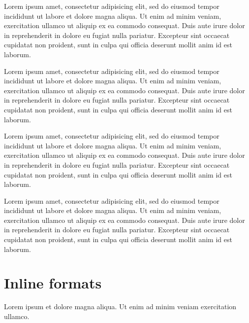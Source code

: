 \documentclass{article}
\begin{document}
\begin{multicols}{2}
Lorem ipsum  amet, consectetur adipisicing elit, sed
do eiusmod tempor incididunt ut labore et dolore magna aliqua. Ut enim
ad minim veniam,  exercitation ullamco
 ut aliquip ex ea commodo consequat. Duis aute
irure dolor in reprehenderit in 
dolore eu fugiat nulla pariatur. Excepteur sint occaecat cupidatat non
proident, sunt in culpa qui officia deserunt mollit anim id est laborum.

Lorem ipsum  amet, consectetur adipisicing elit, sed
do eiusmod tempor incididunt ut labore et dolore magna aliqua. Ut enim
ad minim veniam,  exercitation ullamco
 ut aliquip ex ea commodo consequat. Duis aute
irure dolor in reprehenderit in 
dolore eu fugiat nulla pariatur. Excepteur sint occaecat cupidatat non
proident, sunt in culpa qui officia deserunt mollit anim id est laborum.

Lorem ipsum  amet, consectetur adipisicing elit, sed
do eiusmod tempor incididunt ut labore et dolore magna aliqua. Ut enim
ad minim veniam,  exercitation ullamco
 ut aliquip ex ea commodo consequat. Duis aute
irure dolor in reprehenderit in 
dolore eu fugiat nulla pariatur. Excepteur sint occaecat cupidatat non
proident, sunt in culpa qui officia deserunt mollit anim id est laborum.

Lorem ipsum  amet, consectetur adipisicing elit, sed
do eiusmod tempor incididunt ut labore et dolore magna aliqua. Ut enim
ad minim veniam,  exercitation ullamco
 ut aliquip ex ea commodo consequat. Duis aute
irure dolor in reprehenderit in 
dolore eu fugiat nulla pariatur. Excepteur sint occaecat cupidatat non
proident, sunt in culpa qui officia deserunt mollit anim id est laborum.
\end{multicols}

\section{Inline formats}

Lorem ipsum  et
dolore magna aliqua. Ut enim ad minim veniam exercitation ullamco.
\end{document}
